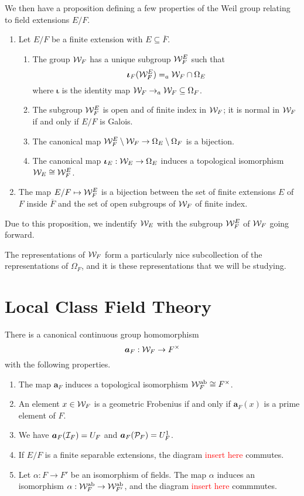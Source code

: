 We then have a proposition defining a few properties of the Weil group relating to field extensions $E/F$.
\begin{prop}
  \begin{enumerate}
    \item Let $E/F$ be a finite extension with $E \subseteq \overline{F}$.
    \begin{enumerate}
      \item The group $\mathcal{W}_F$ has a unique subgroup $\mathcal{W}^E_F$ such that \[\bm{\iota}_F(\mathcal{W}^E_F) = _a\mathcal{W}_F \cap \Omega_E\] where $\bm{\iota}$ is the identity map $\mathcal{W}_F \to _a\mathcal{W}_F \subseteq \Omega_F$.
      \item The subgroup $\mathcal{W}^E_F$ is open and of finite index in $\mathcal{W}_F$; it is normal in $\mathcal{W}_F$ if and only if $E/F$ is Galois.
      \item The canonical map $\mathcal{W}^E_F\setminus \mathcal{W}_F \to \Omega_E \setminus \Omega_F$ is a bijection.
      \item The canonical map $\bm{\iota}_E : \mathcal{W}_E \to \Omega_E$ induces a topological isomorphism $\mathcal{W}_E \cong \mathcal{W}^E_F$.
    \end{enumerate}
    \item The map $E/F \mapsto \mathcal{W}^E_F$ is a bijection between the set of finite extensions $E$ of $F$ inside $\overline{F}$ and the set of open subgroups of $\mathcal{W}_F$ of finite index.
  \end{enumerate}
\end{prop}

Due to this proposition, we indentify $\mathcal{W}_E$ with the subgroup $\mathcal{W}^E_F$ of $\mathcal{W}_F$ going forward.



The representations of $\mathcal{W}_F$ form a particularly nice subcollection of the representations of $\Omega_F$, and it is these representations that we will be studying.
\section{Local Class Field Theory}
\label{sec:LCFT}
\begin{theorem}
\label{thm:LCFT}
  There is a canonical continuous group homomorphism
  \[\bm{a}_F : \mathcal{W}_F \to F^\times\]
  with the following properties.
  \begin{enumerate}
    \item The map $\bm{a}_F$ induces a topological isomorphism $\mathcal{W}_F^{\text{ab}} \cong F^\times$.
    \item An element $x \in \mathcal{W}_F$ is a geometric Frobenius if and only if $\bm{a}_F(x)$ is a prime element of $F$.
    \item We have $\bm{a}_F(\mathcal{I}_F) = U_F$ and $\bm{a}_F(\mathcal{P}_F) = U^1_F$.
    \item If $E/F$ is a finite separable extensions, the diagram \textcolor{red}{insert here} commutes.
    \item Let $\alpha : F \to F'$ be an isomorphism of fields. The map $\alpha$ induces an isomorphism $\alpha: \mathcal{W}^{\text{ab}}_F \to \mathcal{W}^{\text{ab}}_{F'}$, and the diagram \textcolor{red}{insert here} commmutes.
  \end{enumerate}
\end{theorem}

